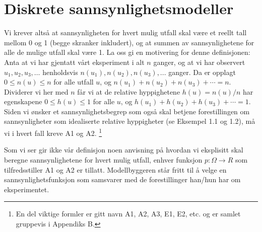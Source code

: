 \section{Diskrete sannsynlighetsmodeller}
\begin{center}  \end{center}
Vi krever altså at sannsynligheten for hvert mulig utfall skal
være et reellt tall mellom 0 og 1 (begge skranker inkludert), og
at summen av sannsynlighetene for alle de mulige utfall skal være
1. La oss gi en motivering for denne definisjonen: Anta at vi har
gjentatt vårt eksperiment i alt $n$ ganger, og at vi har
observert $u_1, u_2, u_3,\ldots$ henholdsvis $n(u_1), n(u_2),
n(u_3),...$ ganger. Da er opplagt $0 \leq n(u)\leq n$ for alle
utfall $u$, og $n(u_1)+n(u_2)+n(u_3)+\cdots=n.$ Dividerer vi her
med $n$ får vi at de relative hyppighetene $h(u)=n(u)/n$ har
egenskapene $0\leq h(u)\leq 1$ for alle $u$, og
$h(u_1)+h(u_2)+h(u_3)+\cdots=1$. Siden vi ønsker et
sannsynlighetsbegrep som også skal betjene
forestillingen om sannsynligheter som idealiserte relative
hyppigheter (se Eksempel 1.1 og 1.2), må vi i hvert fall kreve A1 og A2.
\footnote{En del viktige formler er gitt navn A1, A2, A3,
E1, E2, etc. og er samlet gruppevis i Appendiks B.}

Som vi ser gir ikke vår definisjon noen anvisning på hvordan vi
eks\-plisitt skal beregne sannsynlighetene for hvert mulig utfall,
enhver funksjon $p: \Omega \rightarrow R$ som tilfredsstiller A1
og A2 er tillatt. Modellbyggeren står fritt til å velge en
sannsynlighetsfunksjon som samsvarer med de forestillinger
han/hun har om eksperimentet. \\

